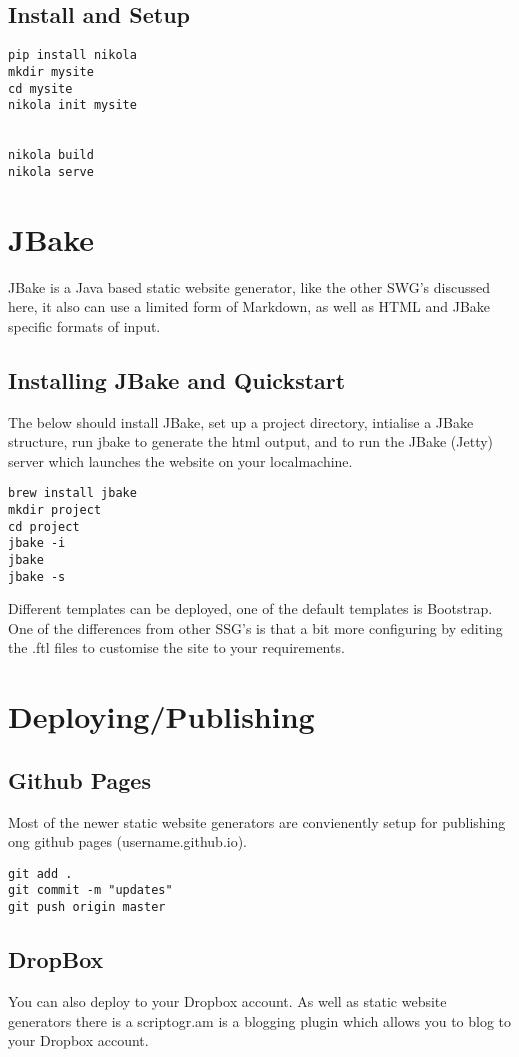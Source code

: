 \documentclass[12pt]{article}			%
\begin{document}
\subsection{Install and Setup}
\begin{verbatim}
pip install nikola
mkdir mysite
cd mysite
nikola init mysite


nikola build
nikola serve 
\end{verbatim}

\newpage
\section{JBake}
JBake is a Java based static website generator, like the other SWG's discussed here, it also can use a limited form of Markdown, as well as HTML and JBake specific formats of input.
\subsection{Installing JBake and Quickstart}
The below should install JBake, set up a project directory, intialise a JBake structure, run jbake to generate the html output, and to run the JBake (Jetty) server which launches the website on your localmachine.
\begin{verbatim}
brew install jbake
mkdir project
cd project
jbake -i
jbake
jbake -s
\end{verbatim}
Different templates can be deployed, one of the default templates is Bootstrap. One of the differences from other SSG's is that a bit more configuring by editing the .ftl files to customise the site to your requirements.

\newpage
\section{Deploying/Publishing}
\subsection{Github Pages}
Most of the newer static website generators are convienently setup for publishing ong github pages (username.github.io).
\begin{verbatim}
git add .
git commit -m "updates"
git push origin master
\end{verbatim}

\subsection{DropBox}
You can also deploy to your Dropbox account. As well as static website generators there is a scriptogr.am is a blogging plugin which allows you to blog to your Dropbox account.
\end{document}
